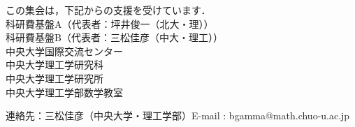 \documentclass[uplatex,a4paper]{jsarticle}
\begin{document}
\noindent
この集会は，下記からの支援を受けています．\\
科研費基盤A（代表者：坪井俊一（北大・理））\\
科研費基盤B（代表者：三松佳彦（中大・理工））\\
中央大学国際交流センター\\
中央大学理工学研究科\\
中央大学理工学研究所\\
中央大学理工学部数学教室

\hrulefill

\noindent
連絡先：三松佳彦（中央大学・理工学部）\quad E-mail : bgamma@math.chuo-u.ac.jp
\end{document}
